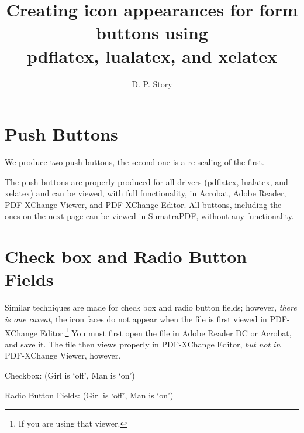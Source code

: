 \documentclass{article}
\title{Creating icon appearances for form buttons using\texorpdfstring{\\}{}
  \textsf{pdflatex}, \textsf{lualatex}, and \textsf{xelatex}}
\author{D. P. Story}
\begin{document}
\maketitle

\section{Push Buttons}

We produce two push buttons, the second one is a re-scaling of the first.\medskip

\noindent{}
\qquad
{}\vcgBdry[12pt]

\noindent The push buttons are properly produced for all drivers
(\textsf{pdflatex}, \textsf{lualatex}, and \textsf{xelatex}) and can be
viewed, with full functionality, in \textsf{Acrobat}, \textsf{Adobe Reader},
\textsf{PDF-XChange Viewer}, and \textsf{PDF-XChange Editor}. All buttons, including
the ones on the next page can be viewed in \textsf{SumatraPDF}, without any functionality.

\newpage

\section{Check box and Radio Button Fields}

Similar techniques are made for check box and radio button fields;
however, \emph{there is one caveat}, the icon faces do not appear when the
file is first viewed in \textsf{PDF-XChange Editor}.\footnote{If you are
using that viewer.} You must first open the file in \textsf{Adobe Reader DC}
or \textsf{Acrobat}, and save it. The file then views properly in
\textsf{PDF-XChange Editor}, \emph{but not in} \textsf{PDF-XChange Viewer},
however.\vcgBdry[6pt]

Checkbox:
\quad(Girl is `off', Man is `on')\vcgBdry[6pt]

Radio Button Fields: \quad {}\quad{}\quad(Girl is `off', Man is `on')\vcgBdry[6pt]
\end{document}
